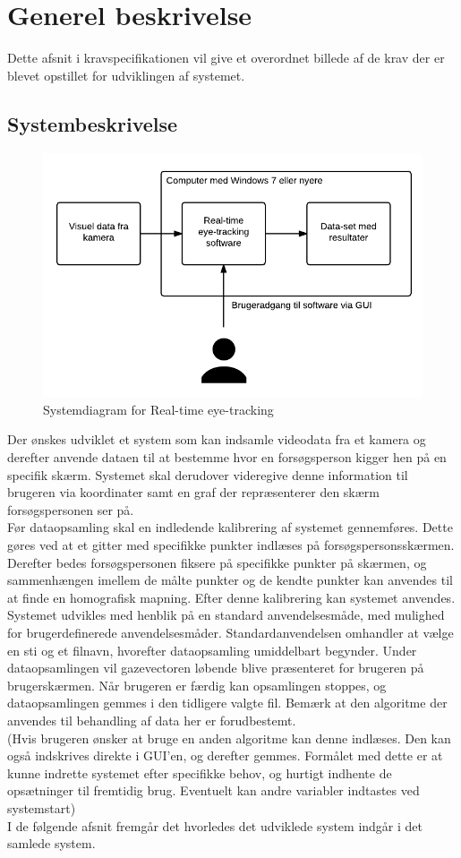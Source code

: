 \documentclass[analyse.tex]{subfiles}
\begin{document}
\section{Generel beskrivelse}
Dette afsnit i kravspecifikationen vil give et overordnet billede af de krav der er blevet opstillet for udviklingen af systemet.
	
\subsection{Systembeskrivelse}
\begin{figure}[h]
\centering
\includegraphics[width=0.7\linewidth]{../Systemdiagram.png}
\caption[Systemdiagram]{Systemdiagram for Real-time eye-tracking}
\label{fig:Systemdiagram}
\end{figure}
Der ønskes udviklet et system som kan indsamle videodata fra et kamera og derefter anvende dataen til
at bestemme hvor en forsøgsperson kigger hen på en specifik skærm. Systemet skal derudover videregive
denne information til brugeren via koordinater samt en graf der repræsenterer den skærm forsøgspersonen
ser på.
\\
\indent
Før dataopsamling skal en indledende kalibrering af systemet gennemføres. Dette gøres ved at et gitter med
specifikke punkter indlæses på forsøgspersonsskærmen. Derefter bedes forsøgspersonen fiksere på specifikke punkter
på skærmen, og sammenhængen imellem de målte punkter og de kendte punkter kan anvendes til at finde en
homografisk mapning. Efter denne kalibrering kan systemet anvendes.
\\
\indent
Systemet udvikles med henblik på en standard anvendelsesmåde, med mulighed for brugerdefinerede anvendelsesmåder. 
Standardanvendelsen omhandler at vælge en sti og et filnavn, hvorefter dataopsamling umiddelbart begynder.
Under dataopsamlingen vil gazevectoren løbende blive præsenteret for brugeren på brugerskærmen. Når brugeren er 
færdig kan opsamlingen stoppes, og dataopsamlingen gemmes i den tidligere valgte fil. Bemærk at den algoritme
der anvendes til behandling af data her er forudbestemt.
\\
(Hvis brugeren ønsker at bruge en anden algoritme kan denne indlæses. Den kan også indskrives direkte i
GUI'en, og derefter gemmes. Formålet med dette er at kunne indrette systemet efter specifikke behov, og
hurtigt indhente de opsætninger til fremtidig brug. Eventuelt kan andre variabler indtastes ved systemstart) 
\\
\indent
I de følgende afsnit fremgår det hvorledes det udviklede system indgår i det samlede system.
\end{document}
